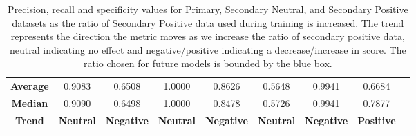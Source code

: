 \begin{table}[ht]
{\begin{tabular}{ccccccccc}
            \midrule
            \textbf{Average}                      & 0.9083                                        & 0.6508                                         & 1.0000                      & 0.8626             & 0.5648           & 0.9941               & 0.6684            \\
            \textbf{Median}                       & 0.9090                                        & 0.6498                                         & 1.0000                      & 0.8478             & 0.5726           & 0.9941               & 0.7877            \\
            \midrule
            \textbf{Trend}                        & \textbf{Neutral}                              & \textbf{Negative}                              & \textbf{Neutral}            & \textbf{Negative}  & \textbf{Neutral} & \textbf{Negative}    & \textbf{Positive} \\
            \bottomrule
        \end{tabular}%
    }
    \vspace{5pt}
    \caption{Precision, recall and specificity values for Primary, Secondary Neutral, and Secondary Positive datasets as the ratio of Secondary Positive data used during training is increased. The trend represents the direction the metric moves as we increase the ratio of secondary positive data, neutral indicating no effect and negative/positive indicating a decrease/increase in score. The ratio chosen for future models is bounded by the blue box.}
    \label{tab:ratio_test}
\end{table}

